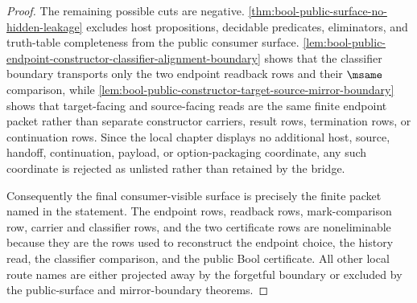 \begin{proof}
The remaining possible cuts are negative. \autoref{thm:bool-public-surface-no-hidden-leakage} excludes host propositions, decidable predicates, eliminators, and truth-table completeness from the public consumer surface. \autoref{lem:bool-public-endpoint-constructor-classifier-alignment-boundary} shows that the classifier boundary transports only the two endpoint readback rows and their $\msame$ comparison, while \autoref{lem:bool-public-constructor-target-source-mirror-boundary} shows that target-facing and source-facing reads are the same finite endpoint packet rather than separate constructor carriers, result rows, termination rows, or continuation rows. Since the local chapter displays no additional host, source, handoff, continuation, payload, or option-packaging coordinate, any such coordinate is rejected as unlisted rather than retained by the bridge.

Consequently the final consumer-visible surface is precisely the finite packet named in the statement. The endpoint rows, readback rows, mark-comparison row, carrier and classifier rows, and the two certificate rows are noneliminable because they are the rows used to reconstruct the endpoint choice, the history read, the classifier comparison, and the public Bool certificate. All other local route names are either projected away by the forgetful boundary or excluded by the public-surface and mirror-boundary theorems.
\end{proof}

